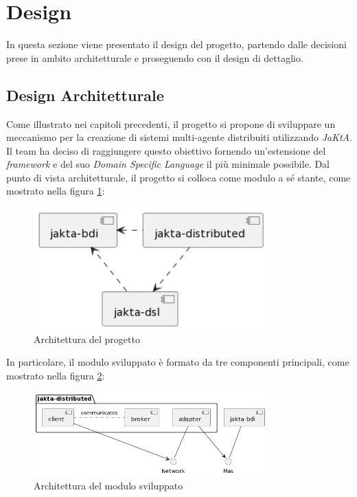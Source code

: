 \section{Design}
In questa sezione viene presentato il design del progetto, partendo dalle decisioni prese in ambito architetturale e proseguendo con il design di dettaglio.

\subsection{Design Architetturale}
Come illustrato nei capitoli precedenti, il progetto si propone di sviluppare un meccanismo per la creazione di sistemi multi-agente distribuiti utilizzando \textit{JaKtA}.
Il team ha deciso di raggiungere questo obiettivo fornendo un'estensione del \textit{framework} e del suo \textit{Domain Specific Language} il più minimale possibile.
Dal punto di vista architetturale, il progetto si colloca come modulo a sé stante, come mostrato nella figura \ref{fig:architecture}:

\begin{figure}[ht!]
    \centering
    \includegraphics[width=0.8\textwidth]{figures/general-architecture.png}
    \caption{Architettura del progetto}
    \label{fig:architecture}
\end{figure}

In particolare, il modulo sviluppato è formato da tre componenti principali, come mostrato nella figura \ref{fig:detailed-architecture}:

\begin{figure}[ht!]
    \centering
    \includegraphics[width=0.8\textwidth]{figures/detailed-architecture.png}
    \caption{Architettura del modulo sviluppato}
    \label{fig:detailed-architecture}
\end{figure}

